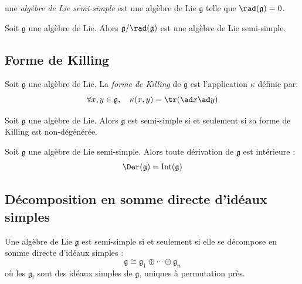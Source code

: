 \begin{definition}
    une \emph{algèbre de Lie semi-simple} est une algèbre de Lie $\mathfrak{g}$ telle que $\rad(\mathfrak{g}) = 0$.
\end{definition}

\begin{proposition}
    Soit $\mathfrak{g}$ une algèbre de Lie. Alors $\mathfrak{g}/\rad(\mathfrak{g})$ est une algèbre de Lie semi-simple.
\end{proposition}

\omitted

\subsection{Forme de Killing}

\begin{definition}
    Soit $\mathfrak{g}$ une algèbre de Lie. La \emph{forme de Killing} de $\mathfrak{g}$ est l'application $\kappa$ définie par:
    $$\forall x, y\in \mathfrak{g}, \quad \kappa(x,y) = \tr(\ad x \ad y)$$
\end{definition}

\begin{proposition}
    Soit $\mathfrak{g}$ une algèbre de Lie. Alors $\mathfrak{g}$ est semi-simple si et seulement si sa forme de Killing est non-dégénérée.
\end{proposition}

\omitted

\begin{proposition}
    Soit $\mathfrak{g}$ une algèbre de Lie semi-simple. Alors toute dérivation de $\mathfrak{g}$ est intérieure :
    $$\Der(\mathfrak{g}) = \mathrm{Int}(\mathfrak{g})$$
\end{proposition}

\omitted

\subsection{Décomposition en somme directe d'idéaux simples}

\begin{proposition}
    Une algèbre de Lie $\mathfrak{g}$ est semi-simple si et seulement si elle se décompose en somme directe d'idéaux simples :
    $$\mathfrak{g} \cong \mathfrak{g}_1 \oplus \cdots \oplus \mathfrak{g}_n$$
    où les $\mathfrak{g}_i$ sont des idéaux simples de $\mathfrak{g}$, uniques à permutation près.
\end{proposition}

\omitted
